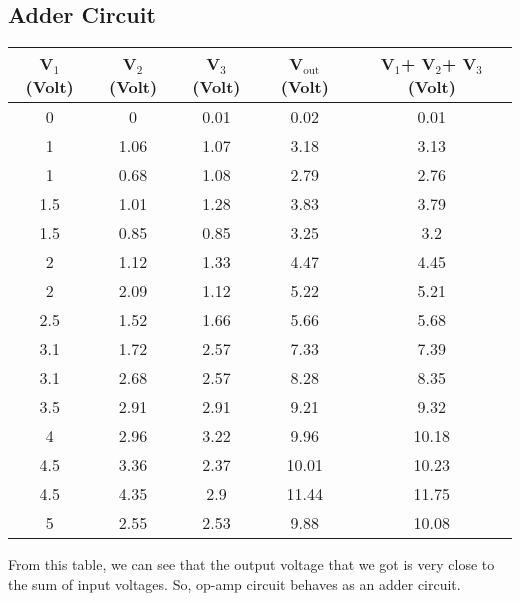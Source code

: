 \documentclass[12pt]{article}
\begin{document}
\subsection{Adder Circuit}
\begin{table}[H]
	\centering
	\begin{tabular}{|c|c|c|c|c|}
		\hline
		V$_1$(Volt) & V$_2$(Volt) & V$_3$(Volt) & V$_\mathrm{out}$(Volt) & V$_1$+ V$_2$+ V$_3$(Volt) \\ \hline \hline
		0                    & 0                    & 0.01                 & 0.02                   & 0.01            \\ \hline
		1                    & 1.06                 & 1.07                 & 3.18                   & 3.13            \\ \hline
		1                    & 0.68                 & 1.08                 & 2.79                   & 2.76            \\ \hline
		1.5                  & 1.01                 & 1.28                 & 3.83                   & 3.79            \\ \hline
		1.5                  & 0.85                 & 0.85                 & 3.25                   & 3.2             \\ \hline
		2                    & 1.12                 & 1.33                 & 4.47                   & 4.45            \\ \hline
		2                    & 2.09                 & 1.12                 & 5.22                   & 5.21            \\ \hline
		2.5                  & 1.52                 & 1.66                 & 5.66                   & 5.68            \\ \hline
		3.1                  & 1.72                 & 2.57                 & 7.33                   & 7.39            \\ \hline
		3.1                  & 2.68                 & 2.57                 & 8.28                   & 8.35            \\ \hline
		3.5                  & 2.91                 & 2.91                 & 9.21                   & 9.32            \\ \hline
		4                    & 2.96                 & 3.22                 & 9.96                   & 10.18           \\ \hline
		4.5                  & 3.36                 & 2.37                 & 10.01                  & 10.23           \\ \hline
		4.5                  & 4.35                 & 2.9                  & 11.44                  & 11.75           \\ \hline
		5                    & 2.55                 & 2.53                 & 9.88                   & 10.08           \\ \hline
	\end{tabular}
\end{table}
From this table, we can see that the output voltage that we got is very close to the sum of input voltages. So, op-amp circuit behaves as an adder circuit.
\end{document}
